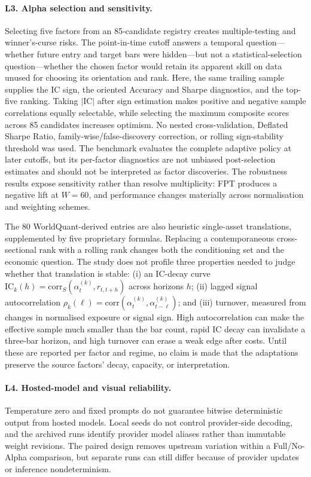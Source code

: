 \paragraph{L3. Alpha selection and sensitivity.}
Selecting five factors from an 85-candidate registry creates multiple-testing and winner's-curse risks. The point-in-time cutoff answers a temporal question---whether future entry and target bars were hidden---but not a statistical-selection question---whether the chosen factor would retain its apparent skill on data unused for choosing its orientation and rank. Here, the same trailing sample supplies the IC sign, the oriented Accuracy and Sharpe diagnostics, and the top-five ranking. Taking $|\mathrm{IC}|$ after sign estimation makes positive and negative sample correlations equally selectable, while selecting the maximum composite scores across 85 candidates increases optimism. No nested cross-validation, Deflated Sharpe Ratio, family-wise/false-discovery correction, or rolling sign-stability threshold was used. The benchmark evaluates the complete adaptive policy at later cutoffs, but its per-factor diagnostics are not unbiased post-selection estimates and should not be interpreted as factor discoveries. The robustness results expose sensitivity rather than resolve multiplicity: FPT produces a negative lift at $W=60$, and performance changes materially across normalisation and weighting schemes.

The 80 WorldQuant-derived entries are also heuristic single-asset translations, supplemented by five proprietary formulas. Replacing a contemporaneous cross-sectional rank with a rolling rank changes both the conditioning set and the economic question. The study does not profile three properties needed to judge whether that translation is stable: (i) an IC-decay curve $\mathrm{IC}_k(h)=\mathrm{corr}_{S}(\alpha^{(k)}_t,r_{t,t+h})$ across horizons $h$; (ii) lagged signal autocorrelation $\rho_k(\ell)=\mathrm{corr}(\alpha^{(k)}_t,\alpha^{(k)}_{t-\ell})$; and (iii) turnover, measured from changes in normalised exposure or signal sign. High autocorrelation can make the effective sample much smaller than the bar count, rapid IC decay can invalidate a three-bar horizon, and high turnover can erase a weak edge after costs. Until these are reported per factor and regime, no claim is made that the adaptations preserve the source factors' decay, capacity, or interpretation.

\paragraph{L4. Hosted-model and visual reliability.}
Temperature zero and fixed prompts do not guarantee bitwise deterministic output from hosted models. Local seeds do not control provider-side decoding, and the archived runs identify provider model aliases rather than immutable weight revisions. The paired design removes upstream variation within a Full/No-Alpha comparison, but separate runs can still differ because of provider updates or inference nondeterminism.

